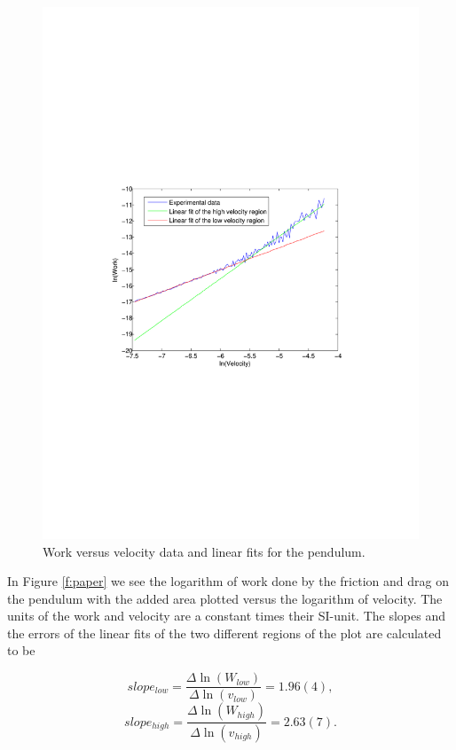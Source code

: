 \documentclass[11pt, a4paper]{article}
\begin{document}
\begin{figure}[h]
	\centering
	\includegraphics[trim=10.0cm 10.0cm 10.0cm 10.0cm, scale=0.7]{no_paper}
	\caption{Work versus velocity data and  linear fits for the pendulum.}
	\label{f:nopaper}
\end{figure}

In Figure \ref{f:paper} we see the logarithm of work done by the friction and 
drag on the pendulum with the added area plotted versus the logarithm of velocity. 
The units of the work and velocity are a constant times their SI-unit. 
The slopes and the errors of the linear fits of the two different regions of the plot are calculated to be

\[
	slope_{low}=\frac{\Delta\ln(W_{low})}{\Delta\ln(v_{low})} = 1.96(4),
\]\[
	slope_{high}=\frac{\Delta\ln(W_{high})}{\Delta\ln(v_{high})} = 2.63(7).
\]
\end{document}
